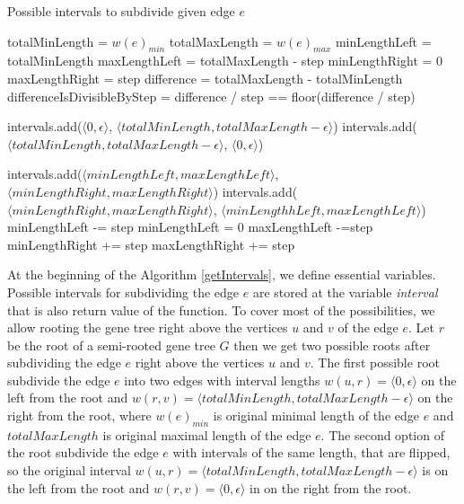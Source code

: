 \begin{algorithm}
\caption{Possible intervals to subdivide given edge $e$} 
\label{getIntervals}
\begin{algorithmic}[1]
	\State totalMinLength = $w(e)_{min}$
	\State totalMaxLength = $w(e)_{max}$
	\State minLengthLeft = totalMinLength
	\State maxLengthLeft = totalMaxLength - step
	\State minLengthRight = 0
	\State maxLengthRight = step
	\State difference = totalMaxLength - totalMinLength
	\State differenceIsDivisibleByStep = difference / step == floor(difference / step)
	
	\State intervals.add($\langle 0, \epsilon \rangle$, $\langle totalMinLength, totalMaxLength-\epsilon \rangle$) 
	\State intervals.add($\langle totalMinLength, totalMaxLength-\epsilon \rangle$, $\langle 0, \epsilon \rangle$)
	
		\State intervals.add($\langle minLengthLeft, maxLengthLeft \rangle$, $\langle minLengthRight, maxLengthRight \rangle$)
			\State intervals.add($\langle minLengthRight, maxLengthRight \rangle$, $\langle minLengthhLeft, maxLengthLeft \rangle$)
		\EndIf
		\State minLengthLeft -= step
			\State minLengthLeft = 0
		\EndIf
		\State maxLengthLeft -=step
		\State minLengthRight += step
		\State maxLengthRight += step
	\EndWhile
\EndFunction
\end{algorithmic}
\end{algorithm}

At the beginning of the Algorithm \ref{getIntervals}, we define essential variables. Possible intervals for subdividing the edge $e$ are stored at the variable \emph{interval} that is also return value of the function. To cover most of the possibilities, we allow rooting the gene tree right above the vertices $u$ and $v$ of the edge $e$. Let $r$ be the root of a semi-rooted gene tree $G$ then we get two possible roots after subdividing the edge $e$ right above the vertices $u$ and $v$. The first possible root subdivide the edge $e$ into two edges with interval lengths $w(u, r) = \langle 0, \epsilon \rangle$ on the left from the root and $w(r, v) = \langle totalMinLength, totalMaxLength-\epsilon \rangle$ on the right from the root, where $w(e)_{min}$ is original minimal length of the edge $e$ and $totalMaxLength$ is original maximal length of the edge $e$. The second option of the root subdivide the edge $e$ with intervals of the same length, that are flipped, so the original interval $w(u, r) = \langle totalMinLength, totalMaxLength-\epsilon \rangle$ is on the left from the root  and $w(r, v) = \langle 0, \epsilon \rangle$ in on the right from the root.

